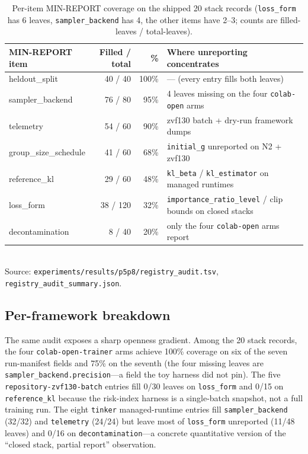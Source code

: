 \documentclass{article}
\begin{document}
\begin{table}[t]
\centering
\caption{Per-item MIN-REPORT coverage on the shipped 20 stack records
(\texttt{loss\_form} has 6 leaves, \texttt{sampler\_backend} has 4,
the other items have 2--3; counts are filled-leaves / total-leaves).}
\label{tab:p6-coverage}
\small
\begin{tabular}{lrrl}
\toprule
MIN-REPORT item & Filled / total & \% & Where unreporting concentrates \\
\midrule
heldout\_split       &  40 /  40 & 100\% & --- (every entry fills both leaves) \\
sampler\_backend     &  76 /  80 &  95\% & 4 leaves missing on the four \texttt{colab-open} arms \\
telemetry            &  54 /  60 &  90\% & zvf130 batch + dry-run framework dumps \\
group\_size\_schedule &  41 /  60 &  68\% & \texttt{initial\_g} unreported on N2 + zvf130 \\
reference\_kl        &  29 /  60 &  48\% & \texttt{kl\_beta} / \texttt{kl\_estimator} on managed runtimes \\
loss\_form           &  38 / 120 &  32\% & \texttt{importance\_ratio\_level} / clip bounds on closed stacks \\
decontamination      &   8 /  40 &  20\% & only the four \texttt{colab-open} arms report \\
\bottomrule
\end{tabular}\\
\footnotesize{Source: \texttt{experiments/results/p5p8/registry\_audit.tsv},
\texttt{registry\_audit\_summary.json}.}
\end{table}

\subsection{Per-framework breakdown}
The same audit exposes a sharp openness gradient. Among the 20 stack
records, the four \texttt{colab-open-trainer} arms achieve 100\% coverage
on six of the seven run-manifest fields and 75\% on the seventh (the four missing
leaves are \texttt{sampler\_backend.precision}---a field the toy harness
did not pin). The five \texttt{repository-zvf130-batch} entries fill 0/30
leaves on \texttt{loss\_form} and 0/15 on \texttt{reference\_kl} because
the risk-index harness is a single-batch snapshot, not a full training
run. The eight \texttt{tinker} managed-runtime entries fill
\texttt{sampler\_backend} (32/32) and \texttt{telemetry} (24/24) but
leave most of \texttt{loss\_form} unreported (11/48 leaves) and 0/16 on
\texttt{decontamination}---a concrete quantitative version of the
``closed stack, partial report'' observation.
\end{document}
